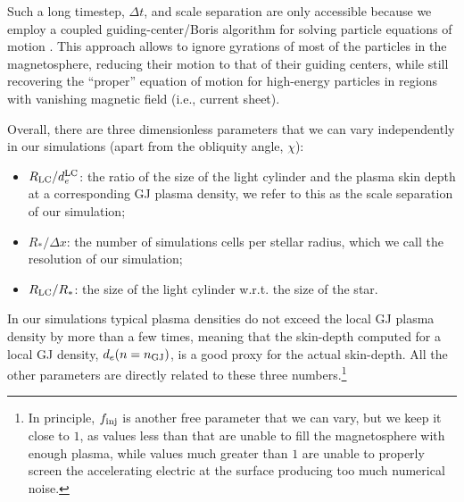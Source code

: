 Such a long timestep, $\Delta t$, and scale separation are only accessible because we employ a coupled guiding-center/Boris algorithm for solving particle equations of motion \citep{2020ApJS..251...10B}. This approach allows to ignore gyrations of most of the particles in the magnetosphere, reducing their motion to that of their guiding centers, while still recovering the ``proper'' equation of motion for high-energy particles in regions with vanishing magnetic field (i.e., current sheet).

Overall, there are three dimensionless parameters that we can vary independently in our simulations (apart from the obliquity angle, $\chi$):
\begin{itemize}
    \item $R_{\rm LC} / d_e^{\rm LC}$: the ratio of the size of the light cylinder and the plasma skin depth at a corresponding GJ plasma density, we refer to this as the scale separation of our simulation;
    \item $R_* / \Delta x$: the number of simulations cells per stellar radius, which we call the resolution of our simulation;
    \item $R_{\rm LC} / R_*$: the size of the light cylinder w.r.t. the size of the star.
\end{itemize}
\noindent In our simulations typical plasma densities do not exceed the local GJ plasma density by more than a few times, meaning that the skin-depth computed for a local GJ density, $d_e(n=n_{\rm GJ})$, is a good proxy for the actual skin-depth. All the other parameters are directly related to these three numbers.\footnote{In principle, $f_{\rm inj}$ is another free parameter that we can vary, but we keep it close to $1$, as values less than that are unable to fill the magnetosphere with enough plasma, while values much greater than $1$ are unable to properly screen the accelerating electric at the surface producing too much numerical noise.}

